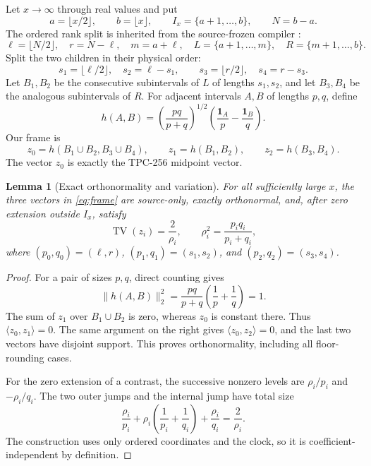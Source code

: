 \documentclass[10pt]{article}
\newtheorem{lemma}[theorem]{Lemma}
\newcommand{\one}{\mathbf 1}
\newcommand{\ip}[2]{\langle #1,#2\rangle}
\newcommand{\TV}{\operatorname{TV}}
\newcommand{\zzero}{z_0}
\newcommand{\zone}{z_1}
\newcommand{\ztwo}{z_2}
\begin{document}
Let \(x\to\infty\) through real values and put
\begin{equation}
 a=\lfloor x/2\rfloor,\qquad b=\lfloor x\rfloor,
 \qquad I_x=\{a+1,\ldots,b\},\qquad N=b-a.
 \label{eq:clock}
\end{equation}
The ordered rank split is inherited from the source-frozen compiler
\cite{tpc253}:
\begin{equation}
 \ell=\lfloor N/2\rfloor,\quad r=N-\ell,\quad m=a+\ell,
 \quad L=\{a+1,\ldots,m\},\quad R=\{m+1,\ldots,b\}.
 \label{eq:rank}
\end{equation}
Split the two children in their physical order:
\begin{equation}
 s_1=\lfloor\ell/2\rfloor,\quad s_2=\ell-s_1,
 \qquad s_3=\lfloor r/2\rfloor,\quad s_4=r-s_3.       \label{eq:blocksizes}
\end{equation}
Let \(B_1,B_2\) be the consecutive subintervals of \(L\) of lengths
\(s_1,s_2\), and let \(B_3,B_4\) be the analogous subintervals of \(R\).
For adjacent intervals \(A,B\) of lengths \(p,q\), define
\begin{equation}
 h(A,B)=\left(\frac{pq}{p+q}\right)^{1/2}
 \left(\frac{\one_A}{p}-\frac{\one_B}{q}\right).       \label{eq:contrast}
\end{equation}
Our frame is
\begin{equation}
 \zzero=h(B_1\cup B_2,B_3\cup B_4),\qquad
 \zone=h(B_1,B_2),\qquad \ztwo=h(B_3,B_4).              \label{eq:frame}
\end{equation}
The vector \(\zzero\) is exactly the TPC-256 midpoint vector.

\begin{lemma}[Exact orthonormality and variation]\label{lem:frame}
For all sufficiently large \(x\), the three vectors in \eqref{eq:frame}
are source-only, exactly orthonormal, and, after zero extension outside
\(I_x\), satisfy
\[
 \TV(z_i)=\frac{2}{\rho_i},
 \qquad \rho_i^2=\frac{p_iq_i}{p_i+q_i},
\]
where \((p_0,q_0)=(\ell,r)\), \((p_1,q_1)=(s_1,s_2)\), and
\((p_2,q_2)=(s_3,s_4)\).
\end{lemma}

\begin{proof}
For a pair of sizes \(p,q\), direct counting gives
\[
 \|h(A,B)\|_2^2=\frac{pq}{p+q}\left(\frac1p+\frac1q\right)=1.
\]
The sum of \(\zone\) over \(B_1\cup B_2\) is zero, whereas \(\zzero\) is
constant there.  Thus \(\ip{\zzero}{\zone}=0\).  The same argument on the
right gives \(\ip{\zzero}{\ztwo}=0\), and the last two vectors have disjoint
support.  This proves orthonormality, including all floor-rounding cases.

For the zero extension of a contrast, the successive nonzero levels are
\(\rho_i/p_i\) and \(-\rho_i/q_i\).  The two outer jumps and the internal
jump have total size
\[
 \frac{\rho_i}{p_i}+\rho_i\left(\frac1{p_i}+\frac1{q_i}\right)
       +\frac{\rho_i}{q_i}
 =\frac{2}{\rho_i}.
\]
The construction uses only ordered coordinates and the clock, so it is
coefficient-independent by definition.
\end{proof}
\end{document}
